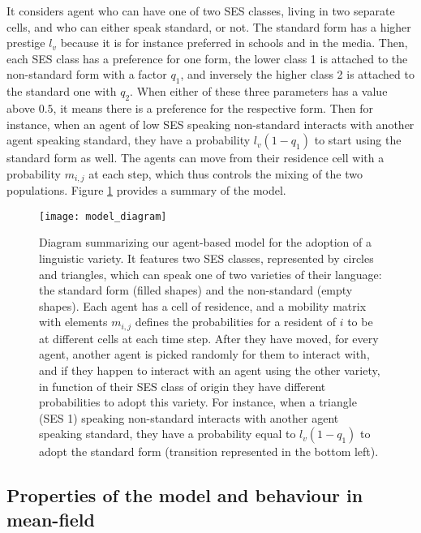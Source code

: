 \documentclass[../thesis.tex]{subfiles}
\begin{document}
It considers agent who can have one of two \ac{SES} classes, living in two separate
cells, and who can either speak standard, or not. The standard form has a higher
prestige $l_v$ because it is for instance preferred in schools and in the media. Then,
each \ac{SES} class has a preference for one form, the lower class 1 is attached to the
non-standard form with a factor $q_1$, and inversely the higher class 2 is attached to
the standard one with $q_2$. When either of these three parameters has a value above
$0.5$, it means there is a preference for the respective form. Then for instance, when
an agent of low \ac{SES} speaking non-standard interacts with another agent speaking
standard, they have a probability $l_v (1 - q_1)$ to start using the standard form as
well. The agents can move from their residence cell with a probability $m_{i,j}$ at each
step, which thus controls the mixing of the two populations. Figure
\ref{fig:model_diagram} provides a summary of the model.
\begin{figure}[hb]
\centering
  \texttt{[image: model\_diagram]}
  \caption{Diagram summarizing our agent-based model for the adoption of a linguistic variety. It features two \ac{SES} classes, represented by circles and triangles, which can speak one of two varieties of their language: the standard form (filled shapes) and the non-standard (empty shapes). Each agent has a cell of residence, and a mobility matrix with elements $m_{i, j}$ defines the probabilities for a resident of $i$ to be at different cells at each time step. After they have moved, for every agent, another agent is picked randomly for them to interact with, and if they happen to interact with an agent using the other variety, in function of their \ac{SES} class of origin they have different probabilities to adopt this variety. For instance, when a triangle (\ac{SES} 1) speaking non-standard interacts with another agent speaking standard, they have a probability equal to $l_v (1 - q_1)$ to adopt the standard form (transition represented in the bottom left).}
  \label{fig:model_diagram}
\end{figure}




\subsection{Properties of the model and behaviour in mean-field}
\end{document}
